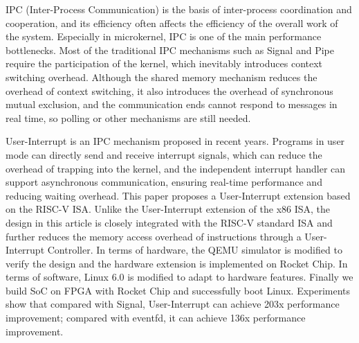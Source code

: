 \begin{abstract*}

  IPC (Inter-Process Communication) is the basis of inter-process coordination and cooperation, and its efficiency often affects the efficiency of the overall work of the system. Especially in microkernel, IPC is one of the main performance bottlenecks. Most of the traditional IPC mechanisms such as Signal and Pipe require the participation of the kernel, which inevitably introduces context switching overhead. Although the shared memory mechanism reduces the overhead of context switching, it also introduces the overhead of synchronous mutual exclusion, and the communication ends cannot respond to messages in real time, so polling or other mechanisms are still needed.
  
  User-Interrupt is an IPC mechanism proposed in recent years. Programs in user mode can directly send and receive interrupt signals, which can reduce the overhead of trapping into the kernel, and the independent interrupt handler can support asynchronous communication, ensuring real-time performance and reducing waiting overhead. This paper proposes a User-Interrupt extension based on the RISC-V ISA. Unlike the User-Interrupt extension of the x86 ISA, the design in this article is closely integrated with the RISC-V standard ISA and further reduces the memory access overhead of instructions through a User-Interrupt Controller. In terms of hardware, the QEMU simulator is modified to verify the design and the hardware extension is implemented on Rocket Chip. In terms of software, Linux 6.0 is modified to adapt to hardware features. Finally we build SoC on FPGA with Rocket Chip and successfully boot Linux. Experiments show that compared with Signal, User-Interrupt can achieve 203x performance improvement; compared with eventfd, it can achieve 136x performance improvement.

\end{abstract*}
